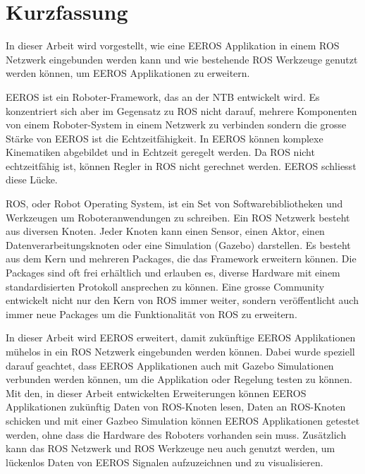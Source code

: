 
\chapter*{Kurzfassung}
In dieser Arbeit wird vorgestellt, wie eine EEROS Applikation in einem ROS Netzwerk eingebunden werden kann und wie bestehende ROS Werkzeuge genutzt werden können, um EEROS Applikationen zu erweitern.

EEROS ist ein Roboter-Framework, das an der NTB entwickelt wird.
Es konzentriert sich aber im Gegensatz zu ROS nicht darauf, mehrere Komponenten von einem Roboter-System in einem Netzwerk zu verbinden sondern die grosse Stärke von EEROS ist die Echtzeitfähigkeit.
In EEROS können komplexe Kinematiken abgebildet und in Echtzeit geregelt werden.
Da ROS nicht echtzeitfähig ist, können Regler in ROS nicht gerechnet werden.
EEROS schliesst diese Lücke.

ROS, oder Robot Operating System, ist ein Set von Softwarebibliotheken und Werkzeugen um Roboteranwendungen zu schreiben.
Ein ROS Netzwerk besteht aus diversen Knoten.
Jeder Knoten kann einen Sensor, einen Aktor, einen Datenverarbeitungsknoten oder eine Simulation (Gazebo) darstellen.
Es besteht aus dem Kern und mehreren Packages, die das Framework erweitern können.
Die Packages sind oft frei erhältlich und erlauben es, diverse Hardware mit einem standardisierten Protokoll ansprechen zu können.
Eine grosse Community entwickelt nicht nur den Kern von ROS immer weiter, sondern veröffentlicht auch immer neue Packages um die Funktionalität von ROS zu erweitern.

In dieser Arbeit wird EEROS erweitert, damit zukünftige EEROS Applikationen mühelos in ein ROS Netzwerk eingebunden werden können.
Dabei wurde speziell darauf geachtet, dass EEROS Applikationen auch mit Gazebo Simulationen verbunden werden können, um die Applikation oder Regelung testen zu können.
Mit den, in dieser Arbeit entwickelten Erweiterungen können EEROS Applikationen zukünftig Daten von ROS-Knoten lesen, Daten an ROS-Knoten schicken und mit einer Gazbeo Simulation können EEROS Applikationen getestet werden, ohne dass die Hardware des Roboters vorhanden sein muss.
Zusätzlich kann das ROS Netzwerk und ROS Werkzeuge neu auch genutzt werden, um lückenlos Daten von EEROS Signalen aufzuzeichnen und zu visualisieren.






